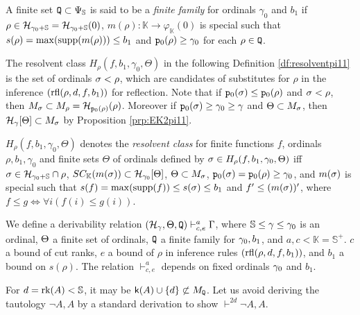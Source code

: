 \documentclass{article}
\newcommand{\mS}{\mathbb{S}}
\newcommand{\mK}{\mathbb{K}}
\begin{document}
\bdf\label{df:cap.2}
{\rm
A finite set ${\tt Q}\subset\Psi_{\mS}$
is said to be a \textit{finite family} for ordinals $\gamma_{0}$ and $b_{1}$
if 
$\rho\in\calh_{\gam_{0}+\mS}=\calh_{\gam_{0}+\mS}(0)$,
$m(\rho):\mathbb{K} \to\varphi_{\mathbb{K}}(0)$ is special such that 
$s(\rho)=\max({\rm supp}(m(\rho)))\leq b_{1}$
and 
${\tt p}_{0}(\rho)\geq\gamma_{0}$
for each $\rho\in {\tt Q}$.
}
\edf


The resolvent class $H_{\rho}(f,b_{1},\gamma_{0},\Theta)$ in the following Definition \ref{df:resolventpi11}
is the set of ordinals $\sigma<\rho$, which are candidates of substitutes for $\rho$ in the inference
$({\rm rfl}(\rho,d,f,b_{1}))$ for reflection.
Note that if ${\tt p}_{0}(\sigma)\leq {\tt p}_{0}(\rho)$ and $\sigma<\rho$, then 
$M_{\sigma}\subset M_{\rho}={\cal H}_{{\tt p}_{0}(\rho)}(\rho)$.
Moreover if ${\tt p}_{0}(\sigma)\geq\gamma_{0}\geq\gamma$ and $\Theta\subset M_{\sigma}$, then
${\cal H}_{\gamma}[\Theta]\subset M_{\sigma}$ by  Proposition \ref{prp:EK2pi11}.

\bdf\label{df:resolventpi11}
{\rm
$H_{\rho}(f,b_{1},\gamma_{0},\Theta)$
 denotes the \textit{resolvent class} for 
finite functions $f$, 
ordinals $\rho,b_{1},\gamma_{0}$ 
and finite sets $\Theta$ of ordinals defined by
$\sigma\in H_{\rho}(f,b_{1}, \gamma_{0},\Theta)$ iff
$\sig\in\calh_{\gam_{0}+\mS}\cap\rho$,
$SC_{\mK}(m(\sig))\subset\mathcal{H}_{\gamma_{0}}[\Theta]$,
$\Theta\subset M_{\sigma}$,
${\tt p}_{0}(\sigma)={\tt p}_{0}(\rho)\geq\gamma_{0}$,
and $m(\sigma)$ is special such that
$s(f)=\max({\rm supp}(f))\leq s(\sigma)\leq b_{1}$ and 
$f^{\prime} \leq (m(\sigma))^{\prime}$,
where
$f\leq g\Leftrightarrow
\forall i(f(i)\leq g(i))$.
}
\edf






We define a derivability relation
$({\cal H}_{\gamma},\Theta,{\tt Q})\vdash^{a}_{c,e}\Gamma$,
where $\mS\leq\gam\leq\gam_{0}$ is an ordinal, $\Theta$ a finite set of ordinals,
${\tt Q}$ a finite family for $\gamma_{0}, b_{1}$, and 
$a,c<\mK=\mS^{+}$.
 $c$ a bound of cut ranks, 
 $e$ a bound of $\rho$ in inference rules $({\rm rfl}(\rho,d,f,b_{1}))$, and
$b_{1}$ a bound on $s(\rho)$.
The relation $\vdash^{a}_{c,e}$ depends on fixed ordinals $\gamma_{0}$ and $b_{1}$.

For $d=\rk(A)<\mS$, it may be ${\sf k}(A)\cup\{d\}\not\subset M_{{\tt Q}}$.
Let us avoid deriving the tautology $\lnot A,A$ by a standard derivation
to show $\vdash^{2d}\lnot A,A$.
\end{document}
